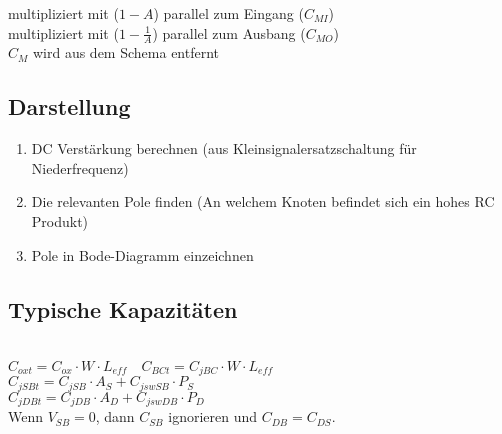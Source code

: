 \begin{multicols}{2}
multipliziert mit ($1-A$) parallel zum Eingang ($C_{MI}$)\\
multipliziert mit ($1-\frac{1}{A}$) parallel zum Ausbang ($C_{MO}$)\\

$C_M$ wird aus dem Schema entfernt\\

\subsection{Darstellung}
\begin{enumerate}
  \item DC Verstärkung berechnen (aus Kleinsignalersatzschaltung für
  Niederfrequenz)
  \item Die relevanten Pole finden (An welchem Knoten befindet sich ein hohes
  RC Produkt)
  \item Pole in Bode-Diagramm einzeichnen
\end{enumerate}

\subsection{Typische Kapazitäten}
 \\

$C_{oxt} = C_{ox} \cdot W \cdot L_{eff}  \quad C_{BCt} = C_{jBC} \cdot W \cdot L_{eff} $ \\
$C_{jSBt} = C_{jSB} \cdot A_S + C_{jswSB} \cdot P_S$ \\
$C_{jDBt} = C_{jDB} \cdot A_D + C_{jswDB} \cdot P_D$ \\

Wenn $V_{SB}=0$, dann $C_{SB}$ ignorieren und $C_{DB}=C_{DS}$.

\end{multicols}